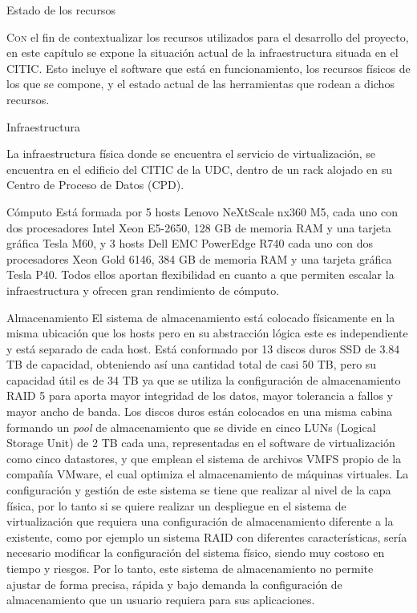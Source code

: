 \begin{chapter}{Estado de los recursos}
\label{chap:estado-recursos-CITIC-VCF}

\lettrine{C}{on} el fin de contextualizar los recursos utilizados para el desarrollo del proyecto, en este capítulo se expone la situación actual de la infraestructura situada en el CITIC. Esto incluye el software que está en funcionamiento, los recursos físicos de los que se compone, y el estado actual de las herramientas que rodean a dichos recursos.

\begin{section}{Infraestructura}

    La infraestructura física donde se encuentra el servicio de virtualización, se encuentra en el edificio del CITIC de la UDC, dentro de un rack alojado en su Centro de Proceso de Datos (CPD)\cite{citicUDC}.
\begin{subsection}{Cómputo}
    Está formada por 5 hosts Lenovo NeXtScale nx360 M5, cada uno con dos procesadores Intel Xeon E5-2650, 128 GB de memoria RAM y una tarjeta gráfica Tesla M60,  y 3 hosts Dell EMC PowerEdge R740 cada uno con dos procesadores Xeon Gold 6146, 384 GB de memoria RAM y una tarjeta gráfica Tesla P40. Todos ellos aportan flexibilidad en cuanto a que permiten escalar la infraestructura y ofrecen gran rendimiento de cómputo.
\end{subsection}
\begin{subsection}{Almacenamiento}
    El sistema de almacenamiento está colocado físicamente en la misma ubicación que los hosts pero en su abstracción lógica este es independiente y está separado de cada host. Está conformado por 13 discos duros SSD de 3.84 TB de capacidad, obteniendo así una cantidad total de casi 50 TB, pero su capacidad útil es de 34 TB ya que se utiliza la configuración de almacenamiento RAID 5 para aporta mayor integridad de los datos, mayor tolerancia a fallos y mayor ancho de banda. Los discos duros están colocados en una misma cabina formando un \textit{pool} de almacenamiento que se divide en cinco LUNs (Logical Storage Unit) de 2 TB cada una, representadas en el software de virtualización como cinco datastores, y que emplean el sistema de archivos VMFS propio de la compañía VMware, el cual optimiza el almacenamiento de máquinas virtuales.
    La configuración y gestión de este sistema se tiene que realizar al nivel de la capa física, por lo tanto si se quiere realizar un despliegue en el sistema de virtualización que requiera una configuración de almacenamiento diferente a la existente, como por ejemplo un sistema RAID con diferentes características, sería necesario modificar la configuración del sistema físico, siendo muy costoso en tiempo y riesgos. Por lo tanto, este sistema de almacenamiento no permite ajustar de forma precisa, rápida y bajo demanda la configuración de almacenamiento que un usuario requiera para sus aplicaciones.
\end{subsection}


\end{section}
\end{chapter}
